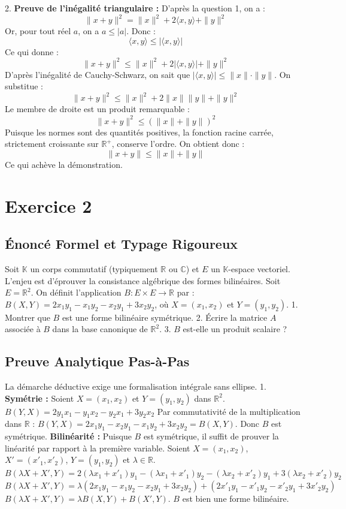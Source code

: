 \documentclass[11pt,a4paper]{report}
\begin{document}
2. \textbf{Preuve de l'inégalité triangulaire :}
   D'après la question 1, on a :
   $$\|x + y\|^2 = \|x\|^2 + 2\langle x, y \rangle + \|y\|^2$$
   Or, pour tout réel $a$, on a $a \le |a|$. Donc :
   $$\langle x, y \rangle \le |\langle x, y \rangle|$$
   Ce qui donne :
   $$\|x + y\|^2 \le \|x\|^2 + 2|\langle x, y \rangle| + \|y\|^2$$
   D'après l'inégalité de Cauchy-Schwarz, on sait que $|\langle x, y \rangle| \le \|x\| \cdot \|y\|$. On substitue :
   $$\|x + y\|^2 \le \|x\|^2 + 2\|x\|\|y\| + \|y\|^2$$
   Le membre de droite est un produit remarquable :
   $$\|x + y\|^2 \le (\|x\| + \|y\|)^2$$
   Puisque les normes sont des quantités positives, la fonction racine carrée, strictement croissante sur $\mathbb{R}^+$, conserve l'ordre. On obtient donc :
   $$\|x + y\| \le \|x\| + \|y\|$$
   Ce qui achève la démonstration.


\section{Exercice 2}


\subsection*{Énoncé Formel et Typage Rigoureux}
Soit $\mathbb{K}$ un corps commutatif (typiquement $\mathbb{R}$ ou $\mathbb{C}$) et $E$ un $\mathbb{K}$-espace vectoriel. L'enjeu est d'éprouver la consistance algébrique des formes bilinéaires.
Soit $E = \mathbb{R}^2$. On définit l'application $B : E \times E \to \mathbb{R}$ par :
$B(X, Y) = 2x_1y_1 - x_1y_2 - x_2y_1 + 3x_2y_2$, où $X = (x_1, x_2)$ et $Y = (y_1, y_2)$.
1. Montrer que $B$ est une forme bilinéaire symétrique.
2. Écrire la matrice $A$ associée à $B$ dans la base canonique de $\mathbb{R}^2$.
3. $B$ est-elle un produit scalaire ?

\subsection*{Preuve Analytique Pas-à-Pas}
La démarche déductive exige une formalisation intégrale sans ellipse.
1. \textbf{Symétrie :}
   Soient $X = (x_1, x_2)$ et $Y = (y_1, y_2)$ dans $\mathbb{R}^2$.
   $B(Y, X) = 2y_1x_1 - y_1x_2 - y_2x_1 + 3y_2x_2$
   Par commutativité de la multiplication dans $\mathbb{R}$ :
   $B(Y, X) = 2x_1y_1 - x_2y_1 - x_1y_2 + 3x_2y_2 = B(X, Y)$.
   Donc $B$ est symétrique.
   \textbf{Bilinéarité :}
   Puisque $B$ est symétrique, il suffit de prouver la linéarité par rapport à la première variable.
   Soient $X = (x_1, x_2)$, $X' = (x'_1, x'_2)$, $Y = (y_1, y_2)$ et $\lambda \in \mathbb{R}$.
   $B(\lambda X + X', Y) = 2(\lambda x_1 + x'_1)y_1 - (\lambda x_1 + x'_1)y_2 - (\lambda x_2 + x'_2)y_1 + 3(\lambda x_2 + x'_2)y_2$
   $B(\lambda X + X', Y) = \lambda(2x_1y_1 - x_1y_2 - x_2y_1 + 3x_2y_2) + (2x'_1y_1 - x'_1y_2 - x'_2y_1 + 3x'_2y_2)$
   $B(\lambda X + X', Y) = \lambda B(X, Y) + B(X', Y)$.
   $B$ est bien une forme bilinéaire.
\end{document}
